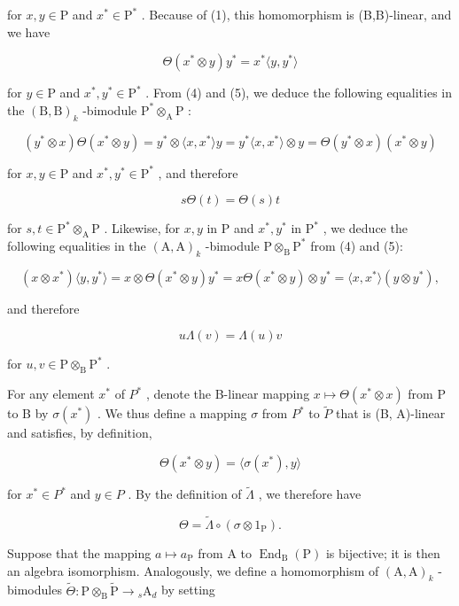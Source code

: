 for \(x, y \in \mathrm{P}\) and \(x^{*} \in \mathrm{P}^{*}\) . Because of (1), this homomorphism is (B,B)-linear, and we have

\[
\Theta (x ^ {*} \otimes y) y ^ {*} = x ^ {*} \langle y, y ^ {*} \rangle\tag{5}
\]

for \(y \in \mathrm{P}\) and \(x^{*}, y^{*} \in \mathrm{P}^{*}\) . From (4) and (5), we deduce the following equalities in the \((\mathrm{B}, \mathrm{B})_{k}\) -bimodule \(\mathrm{P}^{*} \otimes_{\mathrm{A}} \mathrm{P}\) :

\[
(y ^ {*} \otimes x) \Theta (x ^ {*} \otimes y) = y ^ {*} \otimes \langle x, x ^ {*} \rangle y = y ^ {*} \langle x, x ^ {*} \rangle \otimes y = \Theta (y ^ {*} \otimes x) (x ^ {*} \otimes y)
\]

for \(x, y \in \mathrm{P}\) and \(x^{*}, y^{*} \in \mathrm{P}^{*}\) , and therefore

\[
s \Theta (t) = \Theta (s) t\tag{6}
\]

for \(s, t \in \mathrm{P}^* \otimes_{\mathrm{A}} \mathrm{P}\) . Likewise, for \(x, y\) in \(\mathrm{P}\) and \(x^*, y^*\) in \(\mathrm{P}^*\) , we deduce the following equalities in the \((\mathrm{A}, \mathrm{A})_k\) -bimodule \(\mathrm{P} \otimes_{\mathrm{B}} \mathrm{P}^*\) from (4) and (5):

\[
(x \otimes x ^ {*}) \langle y, y ^ {*} \rangle = x \otimes \Theta (x ^ {*} \otimes y) y ^ {*} = x \Theta (x ^ {*} \otimes y) \otimes y ^ {*} = \langle x, x ^ {*} \rangle (y \otimes y ^ {*}),
\]

and therefore

\[
u \Lambda (v) = \Lambda (u) v\tag{7}
\]

for \(u, v \in \mathrm{P} \otimes_{\mathrm{B}} \mathrm{P}^{*}\) .

For any element \(x^{*}\) of \(P^{*}\) , denote the B-linear mapping \(x \mapsto \Theta(x^{*} \otimes x)\) from P to B by \(\sigma(x^{*})\) . We thus define a mapping \(\sigma\) from \(P^{*}\) to \(\widetilde{P}\) that is (B, A)-linear and satisfies, by definition,

\[
\Theta (x ^ {*} \otimes y) = \langle \sigma (x ^ {*}), y \rangle\tag{8}
\]

for \(x^{*} \in P^{*}\) and \(y \in P\) . By the definition of \(\widetilde{\Lambda}\) , we therefore have

\[
\Theta = \widetilde {\Lambda} \circ (\sigma \otimes 1 _ {\mathrm{P}}).\tag{9}
\]

Suppose that the mapping \(a \mapsto a_{\mathrm{P}}\) from A to \(\operatorname{End}_{\mathrm{B}}(\mathrm{P})\) is bijective; it is then an algebra isomorphism. Analogously, we define a homomorphism of \((\mathrm{A}, \mathrm{A})_k\) -bimodules \(\widetilde{\Theta}: \mathrm{P} \otimes_{\mathrm{B}} \widetilde{\mathrm{P}} \to {}_s \mathrm{A}_d\) by setting

